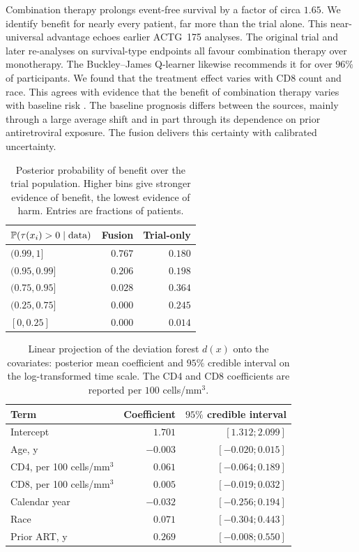 Combination therapy prolongs event-free survival by a factor of circa $1.65$.
We identify benefit for nearly every patient, far more than the trial alone.
This near-universal advantage echoes earlier ACTG~175 analyses.
The original trial \citep{hammer1996} and later re-analyses on survival-type endpoints \citep{lee2026bjboost} all favour combination therapy over monotherapy.
The Buckley--James Q-learner \citep{lee2026bjboost} likewise recommends it for over $96\%$ of participants.
We found that the treatment effect varies with CD8 count and race.
This agrees with evidence that the benefit of combination therapy varies with baseline risk \citep{kennedy2023}.
The baseline prognosis differs between the sources, mainly through a large average shift and in part through its dependence on prior antiretroviral exposure.
The fusion delivers this certainty with calibrated uncertainty.

\begin{table}[!tb]
  \centering
  \caption{Posterior probability of benefit over the trial
    population. Higher bins give stronger evidence of benefit, the
    lowest evidence of harm. Entries are fractions of patients.}
  \label{tab:hte-summary}
  \small
  \begin{tabular}{@{}lrr@{}}
    \toprule
    $\mathbb{P}(\tau(x_i) > 0 \mid \text{data})$        & Fusion & Trial-only \\
    \midrule
    $(0.99, 1]$    & $0.767$ & $0.180$ \\
    $(0.95, 0.99]$ & $0.206$ & $0.198$ \\
    $(0.75, 0.95]$ & $0.028$ & $0.364$ \\
    $(0.25, 0.75]$ & $0.000$ & $0.245$ \\
    $[0, 0.25]$    & $0.000$ & $0.014$ \\
    \bottomrule
  \end{tabular}
\end{table}

\begin{table}[!tb]
  \centering
  \caption{Linear projection of the deviation forest
    $d(x)$ onto the covariates: posterior mean coefficient and $95\%$
    credible interval on the log-transformed time scale. The CD4 and CD8
    coefficients are reported per $100$ cells/mm$^3$.}
  \label{tab:projection}
  \small
  \begin{tabular}{@{}lrr@{}}
    \toprule
    Term          & Coefficient & $95\%$ credible interval \\
    \midrule
    Intercept     & $1.701$  & $[1.312;2.099]$ \\
    \midrule
    Age, y                    & $-0.003$ & $[-0.020;0.015]$ \\
    CD4, per 100 cells/mm$^3$ & $0.061$  & $[-0.064;0.189]$ \\
    CD8, per 100 cells/mm$^3$ & $0.005$  & $[-0.019;0.032]$ \\
    Calendar year & $-0.032$ & $[-0.256;0.194]$ \\
    Race          & $0.071$  & $[-0.304;0.443]$ \\
    Prior ART, y  & $0.269$  & $[-0.008;0.550]$ \\
    \bottomrule
  \end{tabular}
\end{table}
